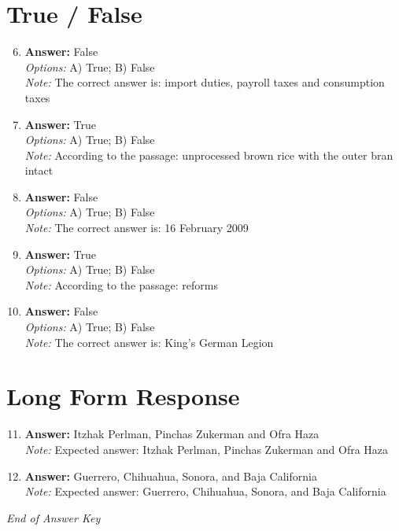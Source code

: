 \documentclass[12pt]{article}
\begin{document}
\section*{True / False}
\begin{enumerate}[label=\arabic*.]
\setcounter{enumi}{5}
\item \textbf{Answer:} False
\\ \textit{Options:} A) True; B) False
\\ \textit{Note:} The correct answer is: import duties, payroll taxes and consumption taxes
\item \textbf{Answer:} True
\\ \textit{Options:} A) True; B) False
\\ \textit{Note:} According to the passage: unprocessed brown rice with the outer bran intact
\item \textbf{Answer:} False
\\ \textit{Options:} A) True; B) False
\\ \textit{Note:} The correct answer is: 16 February 2009
\item \textbf{Answer:} True
\\ \textit{Options:} A) True; B) False
\\ \textit{Note:} According to the passage: reforms
\item \textbf{Answer:} False
\\ \textit{Options:} A) True; B) False
\\ \textit{Note:} The correct answer is: King's German Legion
\end{enumerate}

\section*{Long Form Response}
\begin{enumerate}[label=\arabic*.]
\setcounter{enumi}{10}
\item \textbf{Answer:} Itzhak Perlman, Pinchas Zukerman and Ofra Haza
\\ \textit{Note:} Expected answer: Itzhak Perlman, Pinchas Zukerman and Ofra Haza
\item \textbf{Answer:} Guerrero, Chihuahua, Sonora, and Baja California
\\ \textit{Note:} Expected answer: Guerrero, Chihuahua, Sonora, and Baja California
\end{enumerate}

\vfill
\noindent\textit{End of Answer Key}
\end{document}
